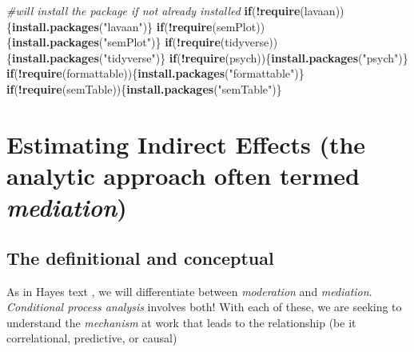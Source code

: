 \documentclass[
  11pt,
]{book}
\newenvironment{Shaded}{\begin{snugshade}}{\end{snugshade}}
\newcommand{\CommentTok}[1]{\textcolor[rgb]{0.37,0.37,0.37}{\textit{#1}}}
\newcommand{\ControlFlowTok}[1]{\textcolor[rgb]{0.27,0.27,0.27}{\textbf{#1}}}
\newcommand{\FunctionTok}[1]{\textcolor[rgb]{0.27,0.27,0.27}{\textbf{#1}}}
\newcommand{\NormalTok}[1]{#1}
\newcommand{\SpecialCharTok}[1]{\textcolor[rgb]{0.43,0.43,0.43}{\textbf{#1}}}
\newcommand{\StringTok}[1]{\textcolor[rgb]{0.5,0.5,0.5}{#1}}
\begin{document}
\begin{Shaded}
\begin{Highlighting}[]
\CommentTok{\#will install the package if not already installed}
\ControlFlowTok{if}\NormalTok{(}\SpecialCharTok{!}\FunctionTok{require}\NormalTok{(lavaan))\{}\FunctionTok{install.packages}\NormalTok{(}\StringTok{"lavaan"}\NormalTok{)\}}
\ControlFlowTok{if}\NormalTok{(}\SpecialCharTok{!}\FunctionTok{require}\NormalTok{(semPlot))\{}\FunctionTok{install.packages}\NormalTok{(}\StringTok{"semPlot"}\NormalTok{)\}}
\ControlFlowTok{if}\NormalTok{(}\SpecialCharTok{!}\FunctionTok{require}\NormalTok{(tidyverse))\{}\FunctionTok{install.packages}\NormalTok{(}\StringTok{"tidyverse"}\NormalTok{)\}}
\ControlFlowTok{if}\NormalTok{(}\SpecialCharTok{!}\FunctionTok{require}\NormalTok{(psych))\{}\FunctionTok{install.packages}\NormalTok{(}\StringTok{"psych"}\NormalTok{)\}}
\ControlFlowTok{if}\NormalTok{(}\SpecialCharTok{!}\FunctionTok{require}\NormalTok{(formattable))\{}\FunctionTok{install.packages}\NormalTok{(}\StringTok{"formattable"}\NormalTok{)\}}
\ControlFlowTok{if}\NormalTok{(}\SpecialCharTok{!}\FunctionTok{require}\NormalTok{(semTable))\{}\FunctionTok{install.packages}\NormalTok{(}\StringTok{"semTable"}\NormalTok{)\}}
\end{Highlighting}
\end{Shaded}

\hypertarget{estimating-indirect-effects-the-analytic-approach-often-termed-mediation}{%
\section{\texorpdfstring{Estimating Indirect Effects (the analytic approach often termed \emph{mediation})}{Estimating Indirect Effects (the analytic approach often termed mediation)}}\label{estimating-indirect-effects-the-analytic-approach-often-termed-mediation}}

\hypertarget{the-definitional-and-conceptual}{%
\subsection{The definitional and conceptual}\label{the-definitional-and-conceptual}}

As in Hayes text \citeyearpar{hayes_introduction_2018}, we will differentiate between \emph{moderation} and \emph{mediation}. \emph{Conditional process analysis} involves both! With each of these, we are seeking to understand the \emph{mechanism} at work that leads to the relationship (be it correlational, predictive, or causal)
\end{document}
